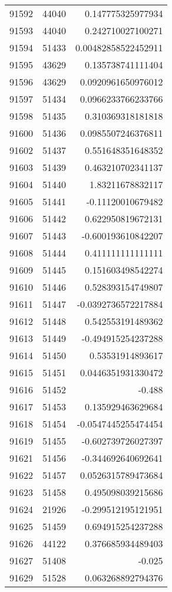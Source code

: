 \begin{tabular}{r | r | r}
91592 & 44040 & 0.147775325977934 \\
91593 & 44040 & 0.242710027100271 \\
91594 & 51433 & 0.00482858522452911 \\
91595 & 43629 & 0.135738741111404 \\
91596 & 43629 & 0.0920961650976012 \\
91597 & 51434 & 0.0966233766233766 \\
91598 & 51435 & 0.310369318181818 \\
91600 & 51436 & 0.0985507246376811 \\
91602 & 51437 & 0.551648351648352 \\
91603 & 51439 & 0.463210702341137 \\
91604 & 51440 & 1.83211678832117 \\
91605 & 51441 & -0.11120010679482 \\
91606 & 51442 & 0.622950819672131 \\
91607 & 51443 & -0.600193610842207 \\
91608 & 51444 & 0.411111111111111 \\
91609 & 51445 & 0.151603498542274 \\
91610 & 51446 & 0.528393154749807 \\
91611 & 51447 & -0.0392736572217884 \\
91612 & 51448 & 0.542553191489362 \\
91613 & 51449 & -0.494915254237288 \\
91614 & 51450 & 0.53531914893617 \\
91615 & 51451 & 0.0446351931330472 \\
91616 & 51452 & -0.488 \\
91617 & 51453 & 0.135929463629684 \\
91618 & 51454 & -0.0547445255474454 \\
91619 & 51455 & -0.602739726027397 \\
91621 & 51456 & -0.344692640692641 \\
91622 & 51457 & 0.0526315789473684 \\
91623 & 51458 & 0.495098039215686 \\
91624 & 21926 & -0.299512195121951 \\
91625 & 51459 & 0.694915254237288 \\
91626 & 44122 & 0.376685934489403 \\
91627 & 51408 & -0.025 \\
91629 & 51528 & 0.063268892794376 \\

\end{tabular}
